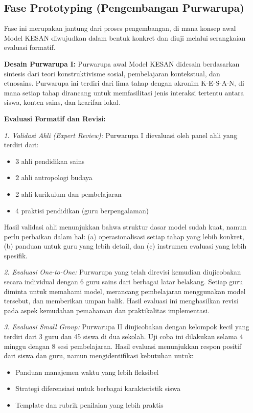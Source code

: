 \documentclass[12pt,a4paper,oneside]{book}
\begin{document}
\subsection{Fase Prototyping (Pengembangan Purwarupa)}

Fase ini merupakan jantung dari proses pengembangan, di mana konsep awal Model KESAN diwujudkan dalam bentuk konkret dan diuji melalui serangkaian evaluasi formatif.

\textbf{Desain Purwarupa I:}
Purwarupa awal Model KESAN didesain berdasarkan sintesis dari teori konstruktivisme sosial, pembelajaran kontekstual, dan etnosains. Purwarupa ini terdiri dari lima tahap dengan akronim K-E-S-A-N, di mana setiap tahap dirancang untuk memfasilitasi jenis interaksi tertentu antara siswa, konten sains, dan kearifan lokal.

\textbf{Evaluasi Formatif dan Revisi:}

\textit{1. Validasi Ahli (Expert Review):}
Purwarupa I dievaluasi oleh panel ahli yang terdiri dari:
\begin{itemize}
\item 3 ahli pendidikan sains
\item 2 ahli antropologi budaya
\item 2 ahli kurikulum dan pembelajaran
\item 4 praktisi pendidikan (guru berpengalaman)
\end{itemize}

Hasil validasi ahli menunjukkan bahwa struktur dasar model sudah kuat, namun perlu perbaikan dalam hal: (a) operasionalisasi setiap tahap yang lebih konkret, (b) panduan untuk guru yang lebih detail, dan (c) instrumen evaluasi yang lebih spesifik.

\textit{2. Evaluasi One-to-One:}
Purwarupa yang telah direvisi kemudian diujicobakan secara individual dengan 6 guru sains dari berbagai latar belakang. Setiap guru diminta untuk memahami model, merancang pembelajaran menggunakan model tersebut, dan memberikan umpan balik. Hasil evaluasi ini menghasilkan revisi pada aspek kemudahan pemahaman dan praktikalitas implementasi.

\textit{3. Evaluasi Small Group:}
Purwarupa II diujicobakan dengan kelompok kecil yang terdiri dari 3 guru dan 45 siswa di dua sekolah. Uji coba ini dilakukan selama 4 minggu dengan 8 sesi pembelajaran. Hasil evaluasi menunjukkan respon positif dari siswa dan guru, namun mengidentifikasi kebutuhan untuk:
\begin{itemize}
\item Panduan manajemen waktu yang lebih fleksibel
\item Strategi diferensiasi untuk berbagai karakteristik siswa
\item Template dan rubrik penilaian yang lebih praktis
\end{itemize}
\end{document}
